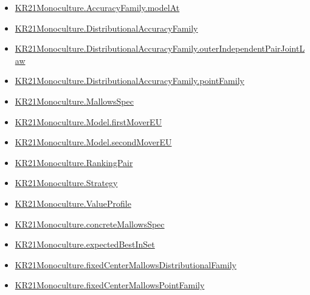 \documentclass[10pt]{article}
\begin{document}
\begin{itemize}
\item \hyperlink{governing-declaration-869d6f3944f2bc91}{KR21\allowbreak{}Monoculture.\allowbreak{}Accuracy\allowbreak{}Family.\allowbreak{}model\allowbreak{}At}
\item \hyperlink{paper-prerequisite-ee564fa2921e1add}{KR21\allowbreak{}Monoculture.\allowbreak{}Distributional\allowbreak{}Accuracy\allowbreak{}Family}
\item \hyperlink{governing-declaration-e6c9a24a5d927c25}{KR21\allowbreak{}Monoculture.\allowbreak{}Distributional\allowbreak{}Accuracy\allowbreak{}Family.\allowbreak{}outer\allowbreak{}Independent\allowbreak{}Pair\allowbreak{}Joint\allowbreak{}Law}
\item \hyperlink{governing-declaration-6c17a1f578028c9d}{KR21\allowbreak{}Monoculture.\allowbreak{}Distributional\allowbreak{}Accuracy\allowbreak{}Family.\allowbreak{}point\allowbreak{}Family}
\item \hyperlink{governing-declaration-b2e6ec0602659b07}{KR21\allowbreak{}Monoculture.\allowbreak{}Mallows\allowbreak{}Spec}
\item \hyperlink{governing-declaration-c7e343ac9b4d37a5}{KR21\allowbreak{}Monoculture.\allowbreak{}Model.\allowbreak{}first\allowbreak{}Mover\allowbreak{}EU}
\item \hyperlink{governing-declaration-e4f79c4b5e166782}{KR21\allowbreak{}Monoculture.\allowbreak{}Model.\allowbreak{}second\allowbreak{}Mover\allowbreak{}EU}
\item \hyperlink{governing-declaration-90a7e19d973f51cb}{KR21\allowbreak{}Monoculture.\allowbreak{}Ranking\allowbreak{}Pair}
\item \hyperlink{paper-prerequisite-b00425a844bd2ddf}{KR21\allowbreak{}Monoculture.\allowbreak{}Strategy}
\item \hyperlink{paper-prerequisite-c0e41e9b0e843969}{KR21\allowbreak{}Monoculture.\allowbreak{}Value\allowbreak{}Profile}
\item \hyperlink{governing-declaration-0e399c7dd166853c}{KR21\allowbreak{}Monoculture.\allowbreak{}concrete\allowbreak{}Mallows\allowbreak{}Spec}
\item \hyperlink{paper-prerequisite-b8698660538f90e1}{KR21\allowbreak{}Monoculture.\allowbreak{}expected\allowbreak{}Best\allowbreak{}In\allowbreak{}Set}
\item \hyperlink{governing-declaration-b8d39c4bb91a22b9}{KR21\allowbreak{}Monoculture.\allowbreak{}fixed\allowbreak{}Center\allowbreak{}Mallows\allowbreak{}Distributional\allowbreak{}Family}
\item \hyperlink{governing-declaration-4b122bb566f4115c}{KR21\allowbreak{}Monoculture.\allowbreak{}fixed\allowbreak{}Center\allowbreak{}Mallows\allowbreak{}Point\allowbreak{}Family}
\end{itemize}
\end{document}
